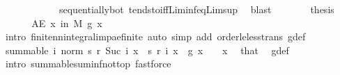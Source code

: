 \begin{isabellebody}
\ \ \ \ \isamarkupfalse%
\ \isamarkupfalse%
\ {\isachardoublequoteopen}{\isachardot}{\kern0pt}{\isachardot}{\kern0pt}{\isachardot}{\kern0pt}\ {\isacharequal}{\kern0pt}\ {}{\isachardoublequoteclose}\ \isamarkupfalse%
\ sequentially{\isacharunderscore}{\kern0pt}bot\ tendsto{\isacharunderscore}{\kern0pt}iff{\isacharunderscore}{\kern0pt}Liminf{\isacharunderscore}{\kern0pt}eq{\isacharunderscore}{\kern0pt}Limsup\ \isamarkupfalse%
\ blast\isanewline
\ \ \ \ \isamarkupfalse%
\ \isamarkupfalse%
\ {\isacharquery}{\kern0pt}thesis\ \isacommand{{\isachardot}{\kern0pt}}\isamarkupfalse%
\isanewline
\ \ \isamarkupfalse%
\isanewline
\ \ \isamarkupfalse%
\ {\isachardoublequoteopen}AE\ x\ in\ M{\isachardot}{\kern0pt}\ g{\isacharprime}{\kern0pt}\ x\ {\isacharless}{\kern0pt}\ {\isasyminfinity}{\isachardoublequoteclose}\ \isamarkupfalse%
\ {\isacharparenleft}{\kern0pt}intro\ finite{\isacharunderscore}{\kern0pt}nn{\isacharunderscore}{\kern0pt}integral{\isacharunderscore}{\kern0pt}imp{\isacharunderscore}{\kern0pt}ae{\isacharunderscore}{\kern0pt}finite{\isacharparenright}{\kern0pt}\ {\isacharparenleft}{\kern0pt}auto\ simp\ add{\isacharcolon}{\kern0pt}\ order{\isacharunderscore}{\kern0pt}le{\isacharunderscore}{\kern0pt}less{\isacharunderscore}{\kern0pt}trans\ g{\isacharprime}{\kern0pt}{\isacharunderscore}{\kern0pt}def{\isacharparenright}{\kern0pt}\isanewline
\ \ \isamarkupfalse%
\ \isamarkupfalse%
\ {\isachardoublequoteopen}summable\ {\isacharparenleft}{\kern0pt}{\isasymlambda}i{\isachardot}{\kern0pt}\ norm\ {\isacharparenleft}{\kern0pt}s\ {\isacharparenleft}{\kern0pt}r\ {\isacharparenleft}{\kern0pt}Suc\ i{\isacharparenright}{\kern0pt}{\isacharparenright}{\kern0pt}\ x\ {\isacharminus}{\kern0pt}\ s\ {\isacharparenleft}{\kern0pt}r\ i{\isacharparenright}{\kern0pt}\ x{\isacharparenright}{\kern0pt}{\isacharparenright}{\kern0pt}{\isachardoublequoteclose}\ \ {\isachardoublequoteopen}g{\isacharprime}{\kern0pt}\ x\ {\isasymnoteq}\ {\isasyminfinity}{\isachardoublequoteclose}\ \ x\ \isamarkupfalse%
\ that\ \isamarkupfalse%
\ g{\isacharprime}{\kern0pt}{\isacharunderscore}{\kern0pt}def\ \isamarkupfalse%
\ {\isacharparenleft}{\kern0pt}intro\ summable{\isacharunderscore}{\kern0pt}suminf{\isacharunderscore}{\kern0pt}not{\isacharunderscore}{\kern0pt}top{\isacharparenright}{\kern0pt}\ fastforce{\isacharplus}{\kern0pt}\ \isanewline

\end{isabellebody}
